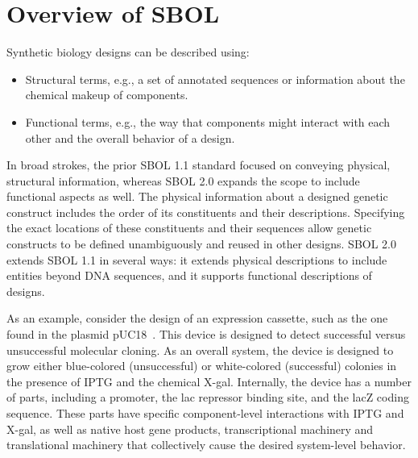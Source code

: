 \section{Overview of SBOL}

Synthetic biology designs can be described using:
\begin{itemize}
\item Structural terms, e.g., a set of annotated sequences or information about the chemical makeup of components.
\item Functional terms, e.g., the way that components might interact with each other and the overall behavior of a design.
\end{itemize}
In broad strokes, the prior SBOL 1.1 standard focused on conveying physical, structural information, whereas SBOL 2.0 expands the scope to include functional aspects as well. 
The physical information about a designed genetic construct includes the order of its constituents and their descriptions. Specifying the exact locations of these constituents and their sequences allow genetic constructs to be defined unambiguously and reused in other designs. SBOL 2.0 extends SBOL 1.1 in several ways: it extends physical descriptions to include entities beyond DNA sequences, and it supports functional descriptions of designs. 

As an example, consider the design of an expression cassette, such as the one found in the plasmid pUC18~\cite{L08752.1}. This device is designed to detect successful versus unsuccessful molecular cloning. 
As an overall system, the device is designed to grow either blue-colored (unsuccessful) or white-colored (successful) colonies in the presence of IPTG and the chemical X-gal. Internally, the device has a number of parts, including a promoter, the lac repressor binding site, and the lacZ coding sequence. 
These parts have specific component-level interactions with IPTG and X-gal, as well as native host gene products, transcriptional machinery and translational machinery that collectively cause the desired system-level behavior. 

